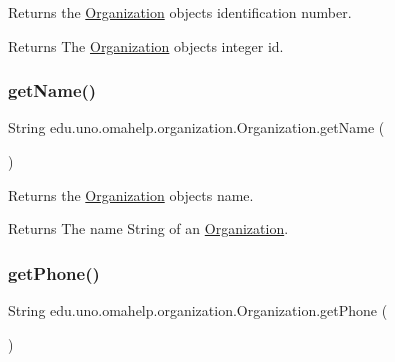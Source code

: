Returns the \mbox{\hyperlink{classedu_1_1uno_1_1omahelp_1_1organization_1_1_organization}{Organization}} object\textquotesingle{}s identification number.

\begin{DoxyReturn}{Returns}
The \mbox{\hyperlink{classedu_1_1uno_1_1omahelp_1_1organization_1_1_organization}{Organization}} object\textquotesingle{}s integer id. 
\end{DoxyReturn}
\mbox{\label{classedu_1_1uno_1_1omahelp_1_1organization_1_1_organization_ab45cf83c988c833389e64df2b4c7109e}} 
\subsubsection{\texorpdfstring{get\+Name()}{getName()}}
{\footnotesize\ttfamily String edu.\+uno.\+omahelp.\+organization.\+Organization.\+get\+Name (\begin{DoxyParamCaption}{ }\end{DoxyParamCaption})}

Returns the \mbox{\hyperlink{classedu_1_1uno_1_1omahelp_1_1organization_1_1_organization}{Organization}} object\textquotesingle{}s name.

\begin{DoxyReturn}{Returns}
The name String of an \mbox{\hyperlink{classedu_1_1uno_1_1omahelp_1_1organization_1_1_organization}{Organization}}. 
\end{DoxyReturn}
\mbox{\label{classedu_1_1uno_1_1omahelp_1_1organization_1_1_organization_aa01e14bd540cd9aa656ed01c21198ee8}} 
\subsubsection{\texorpdfstring{get\+Phone()}{getPhone()}}
{\footnotesize\ttfamily String edu.\+uno.\+omahelp.\+organization.\+Organization.\+get\+Phone (\begin{DoxyParamCaption}{ }\end{DoxyParamCaption})}

